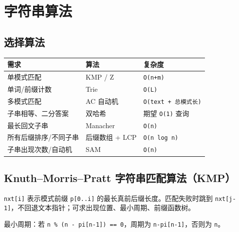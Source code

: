 \chapter{字符串算法}\label{ux5b57ux7b26ux4e32ux7b97ux6cd5}

\section{选择算法}\label{ux9009ux62e9ux7b97ux6cd5}

\begin{longtable}[]{@{}lll@{}}
\toprule\noalign{}
需求 & 算法 & 复杂度 \\
\midrule\noalign{}
\endhead
\bottomrule\noalign{}
\endlastfoot
单模式匹配 & KMP / Z & \passthrough{\lstinline!O(n+m)!} \\
单词/前缀计数 & Trie & \passthrough{\lstinline!O(L)!} \\
多模式匹配 & AC 自动机 & \passthrough{\lstinline!O(text + 总模式长)!} \\
子串相等、二分答案 & 双哈希 & 期望 \passthrough{\lstinline!O(1)!} 查询 \\
最长回文子串 & Manacher & \passthrough{\lstinline!O(n)!} \\
所有后缀排序/不同子串 & 后缀数组 + LCP & \passthrough{\lstinline!O(n log n)!} \\
子串出现次数/自动机 & SAM & \passthrough{\lstinline!O(n)!} \\
\end{longtable}

\section{Knuth--Morris--Pratt 字符串匹配算法（KMP）}\label{knuthmorrispratt-ux5b57ux7b26ux4e32ux5339ux914dux7b97ux6cd5kmp}

\passthrough{\lstinline!nxt[i]!} 表示模式前缀 \passthrough{\lstinline!p[0..i]!} 的最长真前后缀长度。匹配失败时跳到 \passthrough{\lstinline!nxt[j-1]!}，不回退文本指针；可求出现位置、最小周期、前缀函数树。

最小周期：若 \passthrough{\lstinline!n \% (n - pi[n-1]) == 0!}，周期为 \passthrough{\lstinline!n-pi[n-1]!}，否则为 \passthrough{\lstinline!n!}。

